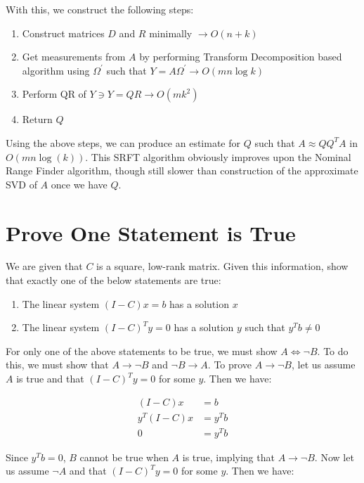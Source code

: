\documentclass{article}[11pt]
\begin{document}
   With this, we construct the following steps:
   
   \begin{enumerate}
   \item Construct matrices $D$ and $R$ minimally $\rightarrow O(n + k)$
   \item Get measurements from $A$ by performing Transform Decomposition based algorithm using $\Omega^{'}$ such that $Y = A\Omega^{'} \rightarrow O(mn \log{k} )$
   \item Perform QR of $Y \ni Y = QR \rightarrow O(mk^2)$
   \item Return $Q$
   \end{enumerate}
   
   Using the above steps, we can produce an estimate for $Q$ such that $A \approx QQ^TA$ in $O(m n \log(k))$. This SRFT algorithm obviously improves upon the Nominal Range Finder algorithm, though still slower than construction of the approximate SVD of $A$ once we have $Q$.
   
   \newpage
   \section{Prove One Statement is True}
   We are given that $C$ is a square, low-rank matrix. Given this information, show that exactly one of the below statements are true:
   
   \begin{enumerate}[label=(\Alph*)]
   \item The linear system $(I-C)x = b$ has a solution $x$
   \item The linear system $(I-C)^Ty = 0$ has a solution $y$ such that $y^Tb \neq 0$
   \end{enumerate}
   
   For only one of the above statements to be true, we must show $A \iff \neg B$. To do this, we must show that $A \rightarrow \neg B$ and $\neg B \rightarrow A$. To prove $A \rightarrow \neg B$, let us assume $A$ is true and that $(I-C)^Ty = 0$ for some $y$. Then we have:
   
   \begin{align*}
   (I-C)x &= b \\
   y^T(I - C)x &= y^Tb \\
   0 &= y^Tb
   \end{align*}
   
   Since $y^Tb = 0$, $B$ cannot be true when $A$ is true, implying that $A \rightarrow \neg B$. Now let us assume $\neg A$ and that $(I-C)^Ty = 0$ for some $y$. Then we have:
   
\end{document}
